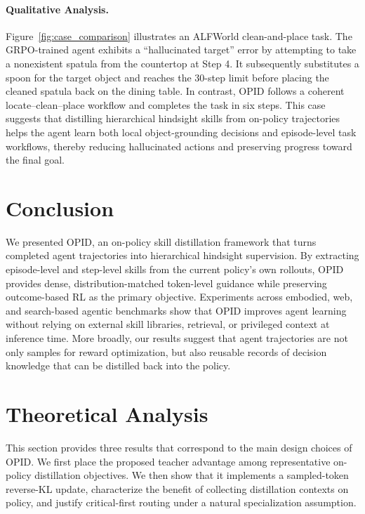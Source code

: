 \documentclass{llmxive}
\begin{document}
\paragraph{Qualitative Analysis. }
Figure~\ref{fig:case_comparison} illustrates an ALFWorld clean-and-place task. The GRPO-trained agent exhibits a “hallucinated target” error by attempting to take a nonexistent spatula from the countertop at Step 4. It subsequently substitutes a spoon for the target object and reaches the 30-step limit before placing the cleaned spatula back on the dining table. In contrast, OPID follows a coherent locate–clean–place workflow and completes the task in six steps. This case suggests that distilling hierarchical hindsight skills from on-policy trajectories helps the agent learn both local object-grounding decisions and episode-level task workflows, thereby reducing hallucinated actions and preserving progress toward the final goal.


\section{Conclusion}
We presented OPID, an on-policy skill distillation framework that turns completed agent trajectories into hierarchical hindsight supervision. By extracting episode-level and step-level skills from the current policy's own rollouts, OPID provides dense, distribution-matched token-level guidance while preserving outcome-based RL as the primary objective. Experiments across embodied, web, and search-based agentic benchmarks show that OPID improves agent learning without relying on external skill libraries, retrieval, or privileged context at inference time. More broadly, our results suggest that agent trajectories are not only samples for reward optimization, but also reusable records of decision knowledge that can be distilled back into the policy.





\appendix

\section{Theoretical Analysis}
\label{app:theory}

This section provides three results that correspond to the main design choices of
OPID. We first place the proposed teacher advantage among representative
on-policy distillation objectives. We then show that it implements a sampled-token
reverse-KL update, characterize the benefit of collecting distillation contexts
on policy, and justify critical-first routing under a natural specialization
assumption.
\end{document}

